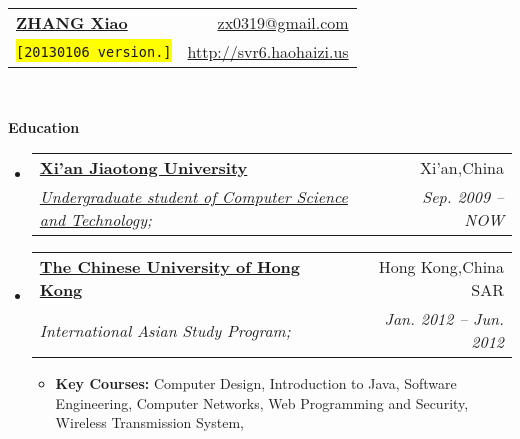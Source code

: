 \documentclass[letterpaper,11pt]{article}
\makeatletter
\newcommand{\resitem}[1]{\item #1 \vspace{-2pt}}
\newcommand{\resheading}[1]{{\large \colorbox{mygrey}{\begin{minipage}{\textwidth}{\textbf{#1 \vphantom{p\^{E}}}}\end{minipage}}}}
\newcommand{\ressubheading}[4]{
\begin{tabular*}{6.5in}{l@{\extracolsep{\fill}}r}
		\textbf{#1} & #2 \\
		\textit{#3} & \textit{#4} \\
\end{tabular*}\vspace{-6pt}}
\makeatother
\begin{document}
\newcommand{\mywebheader}{
\begin{tabular*}{7in}{l@{\extracolsep{\fill}}r}
	\textbf{\href{http://svr6.haohaizi.us/}{\LARGE ZHANG Xiao}} & \href{mailto:zx0319@gmail.com}{zx0319@gmail.com}\\
	{\footnotesize \texttt{\colorbox{yellow}{[20130106 version.]}}} & \href{http://svr6.haohaizi.us}{http://svr6.haohaizi.us} \\
	\end{tabular*}
\\
\vspace{0.1in}}

\mywebheader

\resheading{Education}
	\begin{itemize}
		\item
			\ressubheading{\href{http://www.xjtu.edu.cn}{Xi'an Jiaotong University}}{Xi'an,China}{\href{http://www.cs.xjtu.edu.cn}{Undergraduate student of Computer Science and Technology};}{Sep. 2009 --  NOW}
			
		\item
			\ressubheading{\href{http://www.cuhk.edu.hk}{The Chinese University of Hong Kong}}{Hong Kong,China SAR}{{International Asian Study Program};}{Jan. 2012 -- Jun. 2012}
				{ \footnotesize
				\begin{itemize}
					\resitem
					{\textbf{Key Courses:}
						{Computer Design},
						{Introduction to Java},
						{Software Engineering},
						{Computer Networks},
						{Web Programming and Security},
						{Wireless Transmission System},
					}
				\end{itemize}
			}
	\end{itemize} %
\end{document}
